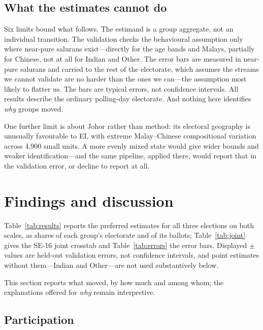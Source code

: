 \documentclass[11pt]{article}
\begin{document}
\subsection{What the estimates cannot do}
\label{sec:strategy-limits}

Six limits bound what follows. The estimand is a group aggregate, not an individual transition. The validation checks the behavioural assumption only where near-pure salurans exist---directly for the age bands and Malays, partially for Chinese, not at all for Indian and Other. The error bars are measured in near-pure salurans and carried to the rest of the electorate, which assumes the streams we cannot validate are no harder than the ones we can---the assumption most likely to flatter us. The bars are typical errors, not confidence intervals. All results describe the ordinary polling-day electorate. And nothing here identifies \emph{why} groups moved.

One further limit is about Johor rather than method: its electoral geography is unusually favourable to EI, with extreme Malay--Chinese compositional variation across 4,900 small units. A more evenly mixed state would give wider bounds and weaker identification---and the same pipeline, applied there, would report that in the validation error, or decline to report at all.

\section{Findings and discussion}
\label{sec:findings}

Table~\ref{tab:results} reports the preferred estimates for all three elections on both scales, as shares of each group's electorate and of its ballots; Table~\ref{tab:joint} gives the SE-16 joint crosstab and Table~\ref{tab:errors} the error bars. Displayed $\pm$ values are held-out validation errors, not confidence intervals, and point estimates without them---Indian and Other---are not used substantively below.

This section reports what moved, by how much and among whom; the explanations offered for \emph{why} remain interpretive.





\subsection{Participation}
\label{sec:findings-turnout}
\end{document}
